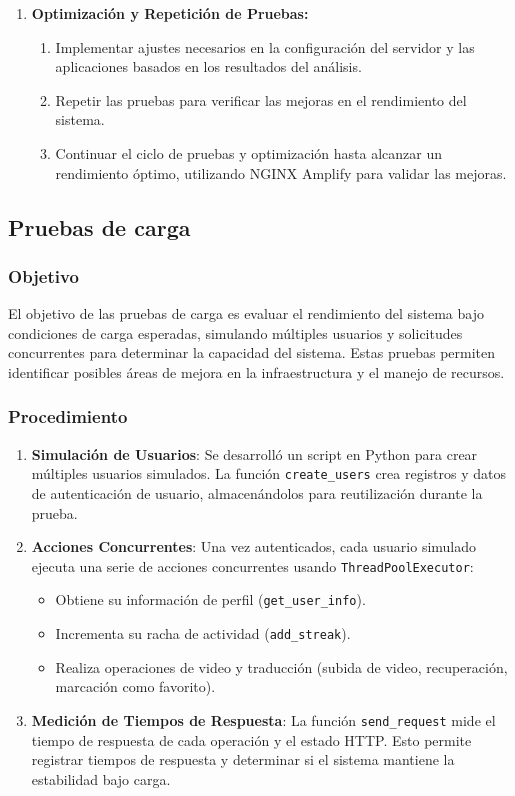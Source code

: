 \begin{enumerate}
    \item \textbf{Optimización y Repetición de Pruebas:}
    \begin{enumerate}[label*=\alph*.]
        \item Implementar ajustes necesarios en la configuración del servidor y las aplicaciones basados en los resultados del análisis.
        \item Repetir las pruebas para verificar las mejoras en el rendimiento del sistema.
        \item Continuar el ciclo de pruebas y optimización hasta alcanzar un rendimiento óptimo, utilizando NGINX Amplify para validar las mejoras.
    \end{enumerate}
\end{enumerate}

\subsection{Pruebas de carga}

\subsubsection{Objetivo}
El objetivo de las pruebas de carga es evaluar el rendimiento del sistema bajo condiciones de carga esperadas, simulando múltiples usuarios y solicitudes concurrentes para determinar la capacidad del sistema. Estas pruebas permiten identificar posibles áreas de mejora en la infraestructura y el manejo de recursos.

\subsubsection{Procedimiento}
\begin{enumerate}
    \item \textbf{Simulación de Usuarios}: Se desarrolló un script en Python para crear múltiples usuarios simulados. La función \texttt{create\_users} crea registros y datos de autenticación de usuario, almacenándolos para reutilización durante la prueba.
    \item \textbf{Acciones Concurrentes}: Una vez autenticados, cada usuario simulado ejecuta una serie de acciones concurrentes usando \texttt{ThreadPoolExecutor}:
    \begin{itemize}
        \item Obtiene su información de perfil (\texttt{get\_user\_info}).
        \item Incrementa su racha de actividad (\texttt{add\_streak}).
        \item Realiza operaciones de video y traducción (subida de video, recuperación, marcación como favorito).
    \end{itemize}
    \item \textbf{Medición de Tiempos de Respuesta}: La función \texttt{send\_request} mide el tiempo de respuesta de cada operación y el estado HTTP. Esto permite registrar tiempos de respuesta y determinar si el sistema mantiene la estabilidad bajo carga.
\end{enumerate}

